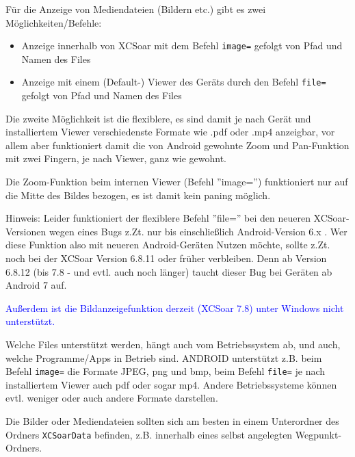Für die Anzeige von Mediendateien (Bildern etc.) gibt es zwei Möglichkeiten/Befehle:

\begin{itemize}
\item Anzeige innerhalb von XCSoar mit dem Befehl \verb|image=| gefolgt von Pfad und Namen des Files
\item Anzeige mit einem (Default-) Viewer des Geräts durch den Befehl \verb|file=| gefolgt von Pfad und Namen des Files
\end{itemize}

Die zweite Möglichkeit ist die flexiblere, es sind damit je nach Gerät und installiertem Viewer verschiedenste Formate wie .pdf oder .mp4 anzeigbar, vor allem aber funktioniert damit die von Android gewohnte Zoom und Pan-Funktion mit zwei Fingern, je nach Viewer, ganz wie gewohnt. 

Die Zoom-Funktion beim internen Viewer (Befehl ''image='') funktioniert nur auf die Mitte des Bildes bezogen, es ist damit kein paning möglich. 

%
%
Hinweis: 
Leider funktioniert der flexiblere Befehl ''file='' bei den neueren XCSoar-Versionen wegen eines Bugs z.Zt. nur bis einschließlich Android-Version 6.x . Wer diese Funktion also mit neueren Android-Geräten Nutzen möchte, sollte z.Zt. noch bei der XCSoar Version 6.8.11 oder früher verbleiben. Denn ab Version 6.8.12 (bis 7.8 - und evtl. auch noch länger) taucht dieser Bug bei Geräten ab Android 7 auf.
% 
% 

\textcolor{blue}{Außerdem ist die Bildanzeigefunktion derzeit (XCSoar 7.8) unter Windows nicht unterstützt.} 



Welche Files unterstützt werden, hängt auch vom Betriebssystem ab, und auch, welche Programme/Apps
in Betrieb sind. ANDROID unterstützt z.B. beim Befehl \verb|image=| die Formate JPEG, png und bmp, beim Befehl \verb|file=| je nach installiertem Viewer auch pdf oder sogar mp4.
Andere Betriebssysteme können evtl. weniger oder auch andere Formate darstellen.

Die Bilder oder Mediendateien sollten sich am besten in einem Unterordner des Ordners \verb|XCSoarData| befinden, z.B. innerhalb eines selbst angelegten Wegpunkt-Ordners.

